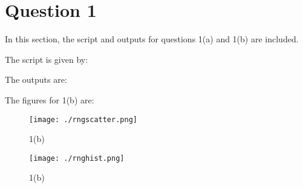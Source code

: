 \section{Question 1}

In this section, the script and outputs for questions 1(a) and 1(b) are included.
 
The script is given by:

The outputs are:


The figures for 1(b) are:

\begin{figure}[h!]
  \centering
  \texttt{[image: ./rngscatter.png]}
  \caption{1(b)}
  \label{fig:fig1}
\end{figure}

\begin{figure}[h!]
  \centering
  \texttt{[image: ./rnghist.png]}
  \caption{1(b)}
  \label{fig:fig2}
\end{figure}

